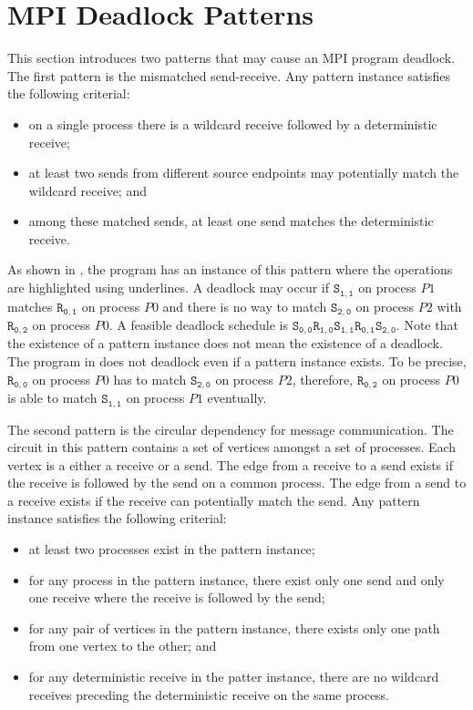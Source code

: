 \section{MPI Deadlock Patterns}
This section introduces two patterns that may cause an MPI program deadlock.  The first pattern is the mismatched send-receive. 
Any pattern instance satisfies the following criterial:
\begin{itemize}
\item on a single process there is a wildcard receive followed by a deterministic receive; 
\item at least two sends from different source endpoints may potentially match the wildcard receive; and
\item among these matched sends, at least one send matches the deterministic receive. 
\end{itemize}

\examplefigone

As shown in , the program has an instance of this pattern where the operations are highlighted using underlines. A deadlock may occur if $\mathtt{S_{1,1}}$ on process $P1$ matches $\mathtt{R_{0,1}}$ on process $P0$ and there is no way to match $\mathtt{S_{2,0}}$ on process $P2$ with $\mathtt{R_{0,2}}$ on process $P0$. A feasible deadlock schedule is $\mathtt{S_{0,0}}$$\mathtt{R_{1,0}}$$\mathtt{S_{1,1}}$$\mathtt{R_{0,1}}$$\mathtt{S_{2,0}}$. Note that the existence of a pattern instance does not mean the existence of a deadlock. The program in  does not deadlock even if a pattern instance exists. To be precise, $\mathtt{R_{0,0}}$ on process $P0$ has to match $\mathtt{S_{2,0}}$ on process $P2$, therefore, $\mathtt{R_{0,2}}$ on process $P0$ is able to match $\mathtt{S_{1,1}}$ on process $P1$ eventually. 

\examplefigtwo

The second pattern is the circular dependency for message communication. The circuit in this pattern contains a set of vertices amongst a set of processes. Each vertex is a either a receive or a send. The edge from a receive to a send exists if the receive is followed by the send on a common process. The edge from a send to a receive exists if the receive can potentially match the send. Any pattern instance satisfies the following criterial:
\begin{itemize}
\item at least two processes exist in the pattern instance;
\item for any process in the pattern instance, there exist only one send and only one receive where the receive is followed by the send;
\item for any pair of vertices in the pattern instance, there exists only one path from one vertex to the other; and
\item for any deterministic receive in the patter instance, there are no wildcard receives preceding the deterministic receive on the same process.
\end{itemize}

